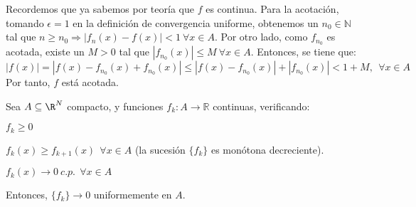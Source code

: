 \begin{sol}
    Recordemos que ya sabemos por teoría que $f$ es continua. Para la acotación, tomando $\epsilon = 1$ en la definición de convergencia uniforme, obtenemos un $n_0 \in \mathbb{N}$ tal que $n \ge n_0 \Rightarrow |f_n(x) - f(x)| < 1\ \forall x \in A$. Por otro lado, como $f_{n_0}$ es acotada, existe un $M>0$ tal que $|f_{n_0}(x)| \le M\ \forall x \in A$. Entonces, se tiene que: $$|f(x)| = |f(x) - f_{n_0}(x) + f_{n_0}(x)| \le |f(x) - f_{n_0}(x)| + |f_{n_0}(x)| < 1 + M, \ \ \forall x \in A$$
    Por tanto, $f$ está acotada.
  \end{sol}

\begin{ejer}
  \label{dini}
  Sea $A\subseteq \R^N$ compacto, y funciones $f_k : A \to \mathbb{R}$ continuas, verificando:

  \begin{nlist}
  \item $f_k \geq 0$
  \item $f_k(x) \geq f_{k+1}(x)\ \ \forall x \in A$ (la sucesión $\{f_k\}$ es monótona decreciente).
  \item $f_k(x) \to 0\ c.p.\ \ \forall x \in A$
  \end{nlist}

  Entonces, $\{f_k\} \to 0$ uniformemente en $A$.
\end{ejer}

